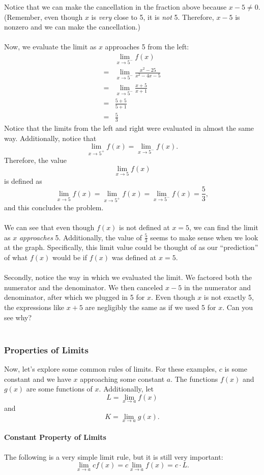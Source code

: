 \documentclass{article}
\begin{document}
Notice that we can make the cancellation in the fraction above because $x-5\neq 0$. (Remember, even though $x$ is \textit{very} close to 5, it is \textit{not} 5. Therefore, $x-5$ is nonzero and we can make the cancellation.)
\\
\\
Now, we evaluate the limit as $x$ approaches 5 from the left:
\begin{align*}
    &\lim_{x\to 5^-} f(x)\\
    =&\lim_{x\to 5^-} \frac{x^2-25}{x^2-4x-5}\\
    =&\lim_{x\to 5^-} \frac{x+5}{x+1}\\
    =&\frac{5+5}{5+1}\\
    =&\frac{5}{3}
\end{align*}
Notice that the limits from the left and right were evaluated in almost the same way. Additionally, notice that 
\[\lim_{x\to 5^+} f(x)=\lim_{x\to 5^-} f(x).\]
Therefore, the value 
\[\lim_{x\to 5} f(x)\]
is defined as 
\[\lim_{x\to 5} f(x)=\lim_{x\to 5^+} f(x)=\lim_{x\to 5^-} f(x)=\frac{5}{3},\]
and this concludes the problem. 
$\boxed{}$\\
\\
We can see that even though $f(x)$ is not defined at $x=5$, we can find the limit as $x$ \textit{approaches} 5. Additionally, the value of $\frac{5}{3}$ seems to make sense when we look at the graph. Specifically, this limit value could be thought of as our ``prediction'' of what $f(x)$ would be if $f(x)$ was defined at $x=5$. 
\\
\\
Secondly, notice the way in which we evaluated the limit. We factored both the numerator and the denominator. We then canceled $x-5$ in the numerator and denominator, after which we plugged in 5 for $x$. Even though $x$ is not exactly 5, the expressions like $x+5$ are negligibly the same as if we used 5 for $x$. Can you see why?
\\
\\
\subsubsection{Properties of Limits}
Now, let's explore some common rules of limits. For these examples, $c$ is some constant and we have $x$ approaching some constant $a$. The functions $f(x)$ and $g(x)$ are some functions of $x$. Additionally, let 
\[L=\lim_{x\to a}f(x)\]
and 
\[K=\lim_{x\to a}g(x).\]
\paragraph{Constant Property of Limits} The following is a very simple limit rule, but it is still very important:
\[\lim_{x\to a} cf(x) = c\lim_{x\to a}f(x)=c\cdot L.\]
\end{document}
